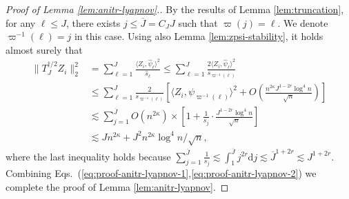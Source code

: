 \documentclass[11pt,a4paper]{article}
\renewcommand{\hat}{\widehat}
\renewcommand{\bar}{\overline}
\theoremstyle{definition}
\theoremstyle{plain}
\theoremstyle{remark}
\newcommand{\ud}{\mathrm d}
\begin{document}
\begin{proof}[Proof of Lemma \ref{lem:anitr-lyapnov}.]
By the results of Lemma \ref{lem:truncation}, for any $\ell\leq J$, there exists $j\leq \bar J=C_J J$ such that $\varpi(j)=\ell$. We denote $\varpi^{-1}(\ell)=j$ in this case. 
Using also Lemma \ref{lem:zpsi-stability}, it holds almost surely that
\begin{align}
\|T_J^{\dagger/2}Z_i\|_2^2  &= \sum_{\ell=1}^J\frac{\langle Z_i,\hat\psi_\ell\rangle^2}{\hat s_\ell}
\leq \sum_{\ell=1}^J\frac{2\langle Z_i,\hat\psi_\ell\rangle^2}{s_{\varpi^{-1}(\ell)}}\nonumber\\
&\leq \sum_{\ell=1}^J \frac{2}{s_{\varpi^{-1}(\ell)}}\left[\langle Z_i,\psi_{\varpi^{-1}(\ell)}\rangle^2 + O\left(\frac{n^{2\kappa}J^{1-2r}\log^4 n}{\sqrt{n}}\right)\right]\nonumber\\
&\lesssim \sum_{j=1}^{\bar J}O(n^{2\kappa})\times\left[1 + \frac{1}{s_j}\cdot \frac{J^{1-2r}\log^4 n}{\sqrt{n}}\right]\nonumber\\
&\lesssim Jn^{2\kappa} + J^2 n^{2\kappa}\log^4 n/\sqrt{n},\label{eq:proof-anitr-lyapnov-2}
\end{align}
where the last inequality holds because $\sum_{j=1}^{\bar J} {\frac{1}{s_j}} \lesssim \int_1^{\bar J}j^{2r}\ud j \lesssim \bar J^{1+2r}\lesssim J^{1+2r}$.
Combining Eqs.~(\ref{eq:proof-anitr-lyapnov-1},\ref{eq:proof-anitr-lyapnov-2}) we complete the proof of Lemma \ref{lem:anitr-lyapnov}.

\end{proof}
\end{document}
